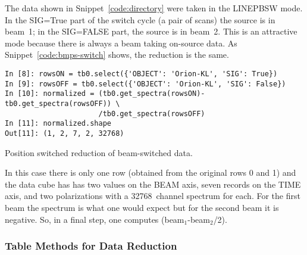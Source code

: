 \documentclass[letterpaper,11pt]{book}
\begin{document}
The data shown in Snippet~\ref{code:directory} were taken in
the {\ttfamily LINEPBSW} mode.  In the {\ttfamily SIG=True} part of the switch
cycle (a pair of scans) the source is in beam~1; in the {\ttfamily SIG=FALSE}
part, the source is in beam~2. This is an attractive mode because there is
always a beam taking on-source data. As Snippet~\ref{code:bmps-switch}
shows, the reduction is the same.
\begin{code}[h!tb]
\begin{center}
{\small \begin{verbatim}
In [8]: rowsON = tb0.select({'OBJECT': 'Orion-KL', 'SIG': True})
In [9]: rowsOFF = tb0.select({'OBJECT': 'Orion-KL', 'SIG': False})
In [10]: normalized = (tb0.get_spectra(rowsON)-tb0.get_spectra(rowsOFF)) \
                      /tb0.get_spectra(rowsOFF) 
In [11]: normalized.shape
Out[11]: (1, 2, 7, 2, 32768)\end{verbatim}
}\caption[Beam and position switched data reduction]{\label{code:bmps-switch}
Position switched reduction of beam-switched data.}
\end{center}
\end{code}
In this case there is only one row (obtained from the original rows 0 and 1)
and the data cube has has two values on the {\ttfamily BEAM} axis,
seven records on the {\ttfamily TIME} axis, and two polarizations with a
32768~channel spectrum for each. For the first beam the spectrum is what one
would expect but for the second beam it is negative. So, in a final step, one
computes (beam$_1$-beam$_2$/2).

\subsubsection{{\ttfamily Table} Methods for Data Reduction}
\end{document}
